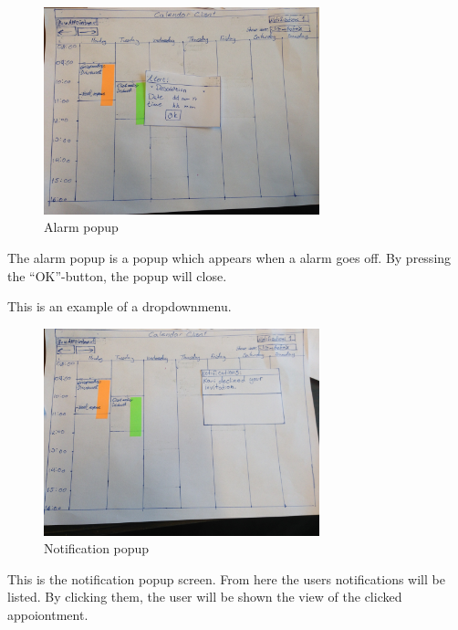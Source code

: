 \documentclass{article}
\begin{document}
\begin{figure}[h!] 
    \begin{center} 
        \includegraphics[width=8cm]{img/IMG_5611.JPG}
        \caption{Alarm popup}
    \label{alarm}
    \end{center}
\end{figure}
The alarm popup is a popup which appears when a alarm goes off. By pressing the ``OK''-button, the popup will close.

This is an example of a dropdownmenu.

\newpage

\begin{figure}[h!] 
    \begin{center} 
        \includegraphics[width=8cm]{img/IMG_5608.JPG}
        \caption{Notification popup}
    \label{notificationpopup}
    \end{center}
\end{figure}

This is the notification popup screen. From here the users notifications will be listed. By clicking them, the user will be shown the view of the clicked appoiontment.

\newpage
\end{document}
